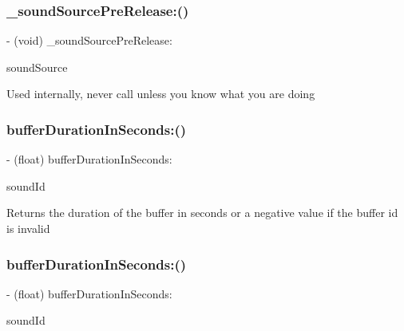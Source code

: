 \subsubsection{\texorpdfstring{\+\_\+sound\+Source\+Pre\+Release\+:()}{\_soundSourcePreRelease:()}\hspace{0.1cm}{\footnotesize\ttfamily [4/4]}}
{\footnotesize\ttfamily -\/ (void) \+\_\+sound\+Source\+Pre\+Release\+: \begin{DoxyParamCaption}\item[{(\hyperlink{interfaceCDSoundSource}{C\+D\+Sound\+Source} $\ast$)}]{sound\+Source }\end{DoxyParamCaption}}

Used internally, never call unless you know what you are doing \mbox{\label{interfaceCDSoundEngine_a5731f4ec2052eb323ba1777f72c9da8c}} 
\subsubsection{\texorpdfstring{buffer\+Duration\+In\+Seconds\+:()}{bufferDurationInSeconds:()}\hspace{0.1cm}{\footnotesize\ttfamily [1/4]}}
{\footnotesize\ttfamily -\/ (float) buffer\+Duration\+In\+Seconds\+: \begin{DoxyParamCaption}\item[{(int)}]{sound\+Id }\end{DoxyParamCaption}}

Returns the duration of the buffer in seconds or a negative value if the buffer id is invalid \mbox{\label{interfaceCDSoundEngine_a5731f4ec2052eb323ba1777f72c9da8c}} 
\subsubsection{\texorpdfstring{buffer\+Duration\+In\+Seconds\+:()}{bufferDurationInSeconds:()}\hspace{0.1cm}{\footnotesize\ttfamily [2/4]}}
{\footnotesize\ttfamily -\/ (float) buffer\+Duration\+In\+Seconds\+: \begin{DoxyParamCaption}\item[{(int)}]{sound\+Id }\end{DoxyParamCaption}}

